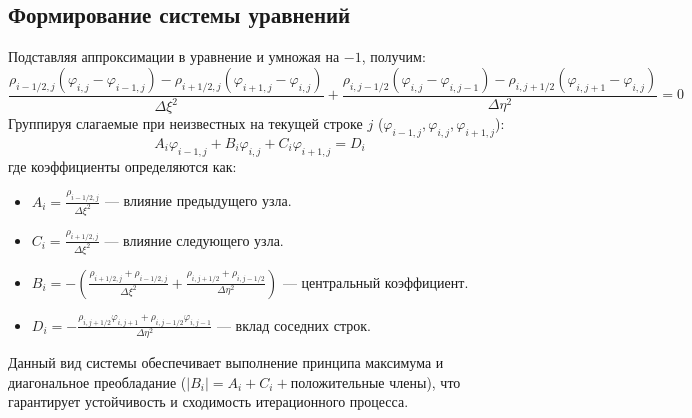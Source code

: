 \subsection{Формирование системы уравнений}

Подставляя аппроксимации в уравнение и умножая на $-1$, получим:
\[
\frac{\rho_{i-1/2,j}(\varphi_{i,j} - \varphi_{i-1,j}) - \rho_{i+1/2,j}(\varphi_{i+1,j} - \varphi_{i,j})}{\Delta \xi^2} + \frac{\rho_{i,j-1/2}(\varphi_{i,j} - \varphi_{i,j-1}) - \rho_{i,j+1/2}(\varphi_{i,j+1} - \varphi_{i,j})}{\Delta \eta^2} = 0
\]
Группируя слагаемые при неизвестных на текущей строке $j$ ($\varphi_{i-1,j}, \varphi_{i,j}, \varphi_{i+1,j}$):
\[
A_i \varphi_{i-1,j} + B_i \varphi_{i,j} + C_i \varphi_{i+1,j} = D_i
\]
где коэффициенты определяются как:
\begin{itemize}
	\item $A_i = \displaystyle \frac{\rho_{i-1/2,j}}{\Delta \xi^2}$ — влияние предыдущего узла.
	\item $C_i = \displaystyle \frac{\rho_{i+1/2,j}}{\Delta \xi^2}$ — влияние следующего узла.
	\item $B_i = \displaystyle -\left( \frac{\rho_{i+1/2,j} + \rho_{i-1/2,j}}{\Delta \xi^2} + \frac{\rho_{i,j+1/2} + \rho_{i,j-1/2}}{\Delta \eta^2} \right)$ — центральный коэффициент.
	\item $D_i = \displaystyle - \frac{\rho_{i,j+1/2} \varphi_{i,j+1} + \rho_{i,j-1/2} \varphi_{i,j-1}}{\Delta \eta^2}$ — вклад соседних строк.
\end{itemize}

Данный вид системы обеспечивает выполнение принципа максимума и диагональное преобладание ($|B_i| = A_i + C_i + \text{положительные члены}$), что гарантирует устойчивость и сходимость итерационного процесса.
